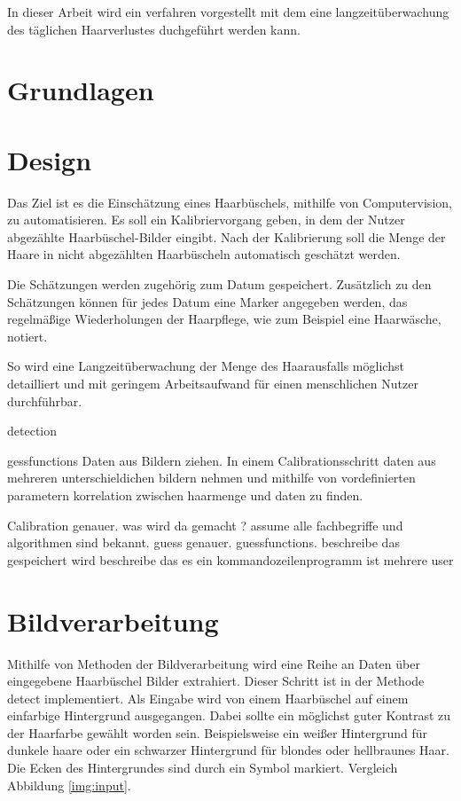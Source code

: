\documentclass[german,a4paper,12pt]{llncs}
\begin{document}
In dieser Arbeit wird ein verfahren vorgestellt mit dem eine langzeitüberwachung des täglichen Haarverlustes duchgeführt werden kann.

\section{Grundlagen}

\section{Design}

Das Ziel ist es die Einschätzung eines Haarbüschels, mithilfe von Computervision, zu automatisieren. Es soll ein Kalibriervorgang geben, in dem der Nutzer abgezählte Haarbüschel-Bilder eingibt. Nach der Kalibrierung soll die Menge der Haare in nicht abgezählten Haarbüscheln automatisch geschätzt werden.

Die Schätzungen werden zugehörig zum Datum gespeichert. 
Zusätzlich zu den Schätzungen können für jedes Datum eine Marker angegeben werden, das regelmäßige Wiederholungen der Haarpflege, wie zum Beispiel eine Haarwäsche, notiert.

So wird eine Langzeitüberwachung der Menge des Haarausfalls möglichst detailliert und mit geringem Arbeitsaufwand für einen menschlichen Nutzer durchführbar.

detection

gessfunctions
Daten aus Bildern ziehen. In einem Calibrationsschritt daten aus mehreren unterschieldichen bildern nehmen und mithilfe von vordefinierten parametern korrelation zwischen haarmenge und daten zu finden.

Calibration genauer. was wird da gemacht ? assume alle fachbegriffe und algorithmen sind bekannt.
guess genauer. guessfunctions. 
beschreibe das gespeichert wird
beschreibe das es ein kommandozeilenprogramm ist
mehrere user
\section{Bildverarbeitung}

Mithilfe von Methoden der Bildverarbeitung wird eine Reihe an Daten über eingegebene Haarbüschel Bilder extrahiert.
Dieser Schritt ist in der Methode detect implementiert.
Als Eingabe wird von einem Haarbüschel auf einem einfarbige Hintergrund ausgegangen. Dabei sollte ein möglichst guter Kontrast zu der Haarfarbe gewählt worden sein. Beispielsweise ein weißer Hintergrund für dunkele haare oder ein schwarzer Hintergrund für blondes oder hellbraunes Haar. Die Ecken des Hintergrundes sind durch ein Symbol markiert. Vergleich Abbildung \ref{img:input}.
\end{document}
